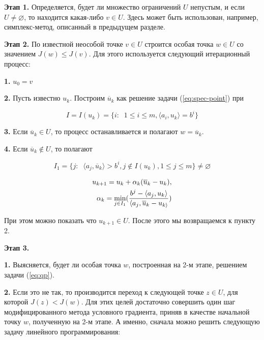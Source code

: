 \documentclass[a4paper, 12pt, titlepage]{article}
\theoremstyle{definition}
\theoremstyle{plain}
\theoremstyle{plain}
\begin{document}
\textbf{Этап 1.} Определяется, будет ли множество ограничений $U$ непустым, и 
если $U \neq \varnothing$, то находится какая-либо $v \in U$. Здесь может быть
использован, например, симплекс-метод, описанный в предыдущем разделе.

\textbf{Этап 2.} По известной неособой точке $v \in U$ строится особая точка
$w \in U$ со значением $J(w) \leq J(v)$. Для этого используется следующий
итерационный процесс:

\textbf{1.} $u_{0} = v$

\textbf{2.} Пусть известно $u_{k}$. Построим $\overline{u}_{k}$ как решение
задачи (\ref{eq:spec-point}) при

\begin{equation}
 I = I(u_{k}) = \{i: \;\;
 1 \leq i \leq m, \langle a_{i}, u_{k} \rangle = b^{i}\}
\end{equation}

\textbf{3.} Если $\overline{u}_{k} \in U$, то процесс останавливается и полагают
$w = \overline{u}_{k}$.

\textbf{4.} Если $\overline{u}_{k} \notin U$, то полагают

\begin{equation}
 I_{1} = \{j: \;\; \langle a_{j}, \overline{u}_{k} \rangle > b^{i},
 j \notin I(u_{k}), 1 \leq j \leq m\} \neq \varnothing
\end{equation}

\begin{equation}
 \begin{aligned}
  u_{k + 1} = u_{k} + \alpha_{k} (\overline{u}_{k} - u_{k}), \\
  \alpha_{k} = \operatornamewithlimits{min}_{j \in I_{1}}
  (\frac{b^{j} - \langle a_{j}, u_{k} \rangle}
  {\langle a_{j}, \overline{u}_{k} - u_{k \rangle}})
 \end{aligned}
\end{equation}

При этом можно показать что $u_{k + 1} \in U$. После этого мы возвращаемся к
пункту 2.

\textbf{Этап 3.} 

\textbf{1.} Выясняется, будет ли особая точка $w$, построенная на 2-м
этапе, решением задачи (\ref{eq:qp}).

\textbf{2.} Если это не так, то производится переход
к следующей точке $z \in U$, для которой $J(z) < J(w)$. Для этих целей 
достаточно совершить один шаг модифицированного метода условного градиента,
приняв в качестве начальной точку $w$, полученную на 2-м этапе. А именно,
сначала можно решить следующую задачу линейного программирования:
\end{document}

